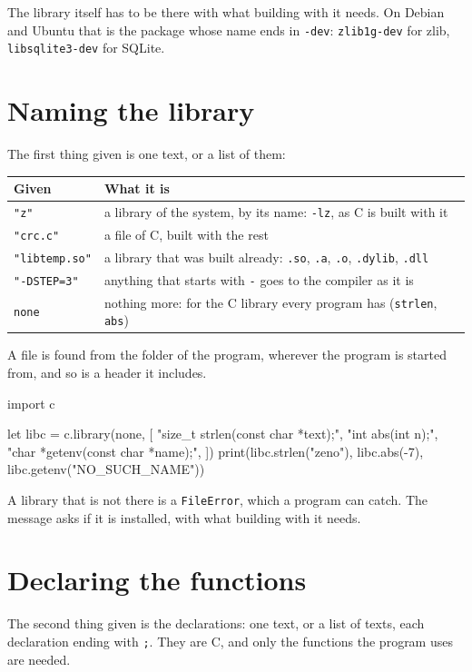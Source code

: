 The library itself has to be there with what building with it needs.
On Debian and Ubuntu that is the package whose name ends in
\verb|-dev|: \verb|zlib1g-dev| for zlib, \verb|libsqlite3-dev| for
SQLite.

\section{Naming the library}

The first thing given is one text, or a list of them:

\begin{center}
\begin{tabular}{lP{8.6cm}}
\toprule
Given & What it is \\
\midrule
\verb|"z"| & a library of the system, by its name: \verb|-lz|, as C is
  built with it \\
\verb|"crc.c"| & a file of C, built with the rest \\
\verb|"libtemp.so"| & a library that was built already: \verb|.so|,
  \verb|.a|, \verb|.o|, \verb|.dylib|, \verb|.dll| \\
\verb|"-DSTEP=3"| & anything that starts with \verb|-| goes to the
  compiler as it is \\
\verb|none| & nothing more: for the C library every program has
  (\verb|strlen|, \verb|abs|) \\
\bottomrule
\end{tabular}
\end{center}

A file is found from the folder of the program, wherever the program
is started from, and so is a header it includes.

\begin{zeno}[file=libc.zeno, dir=maths]
import c

let libc = c.library(none, [
    "size_t strlen(const char *text);",
    "int abs(int n);",
    "char *getenv(const char *name);",
])
print(libc.strlen("zeno"), libc.abs(-7), libc.getenv("NO_SUCH_NAME"))
\end{zeno}

A library that is not there is a \verb|FileError|, which a program can
catch. The message asks if it is installed, with what building with it
needs.

\section{Declaring the functions}

The second thing given is the declarations: one text, or a list of
texts, each declaration ending with \verb|;|. They are C, and only the
functions the program uses are needed.


